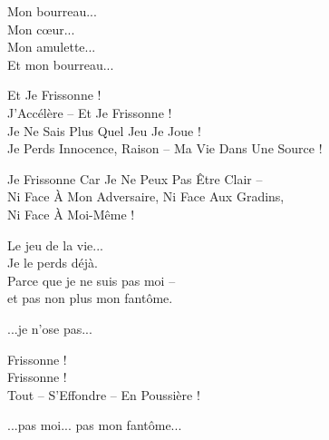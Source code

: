 \begin{lyrics}

Mon bourreau...\\
Mon cœur...\\
Mon amulette...\\
Et mon bourreau...


Et Je Frissonne !\\
J'Accélère – Et Je Frissonne !\\
Je Ne Sais Plus Quel Jeu Je Joue !\\
Je Perds Innocence, Raison – Ma Vie Dans Une Source !

Je Frissonne Car Je Ne Peux Pas Être Clair –\\
Ni Face À Mon Adversaire, Ni Face Aux Gradins,\\
Ni Face À Moi-Même !


Le jeu de la vie...\\
Je le perds déjà.\\
Parce que je ne suis pas moi –\\
et pas non plus mon fantôme.


...je n'ose pas...


Frissonne !\\
Frissonne !\\
Tout – S'Effondre – En Poussière !

...pas moi... pas mon fantôme...

\end{lyrics}

